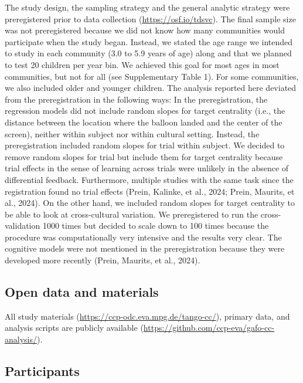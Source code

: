 \documentclass[
  man,floatsintext]{apa7}
\begin{document}
The study design, the sampling strategy and the general analytic strategy were preregistered prior to data collection (\url{https://osf.io/tdsvc}). The final sample size was not preregistered because we did not know how many communities would participate when the study began. Instead, we stated the age range we intended to study in each community (3.0 to 5.9 years of age) along and that we planned to test 20 children per year bin. We achieved this goal for most ages in most communities, but not for all (see Supplementary Table 1). For some communities, we also included older and younger children. The analysis reported here deviated from the preregistration in the following ways: In the preregistration, the regression models did not include random slopes for target centrality (i.e., the distance between the location where the balloon landed and the center of the screen), neither within subject nor within cultural setting. Instead, the preregistration included random slopes for trial within subject. We decided to remove random slopes for trial but include them for target centrality because trial effects in the sense of learning across trials were unlikely in the absence of differential feedback. Furthermore, multiple studies with the same task since the registration found no trial effects (Prein, Kalinke, et al., 2024; Prein, Maurits, et al., 2024). On the other hand, we included random slopes for target centrality to be able to look at cross-cultural variation. We preregistered to run the cross-validation 1000 times but decided to scale down to 100 times because the procedure was computationally very intensive and the results very clear. The cognitive models were not mentioned in the preregistration because they were developed more recently (Prein, Maurits, et al., 2024).

\hypertarget{open-data-and-materials}{%
\subsection{Open data and materials}\label{open-data-and-materials}}

All study materials (\url{https://ccp-odc.eva.mpg.de/tango-cc/}), primary data, and analysis scripts are publicly available (\url{https://github.com/ccp-eva/gafo-cc-analysis/}).

\hypertarget{participants}{%
\subsection{Participants}\label{participants}}
\end{document}
